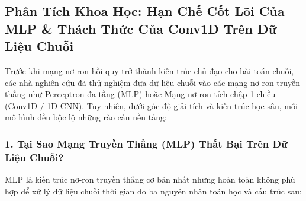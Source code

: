 \documentclass[12pt,a4paper]{report}
\begin{document}
\subsection{Phân Tích Khoa Học: Hạn Chế Cốt Lõi Của MLP \& Thách Thức Của Conv1D Trên Dữ Liệu Chuỗi}
Trước khi mạng nơ-ron hồi quy trở thành kiến trúc chủ đạo cho bài toán chuỗi, các nhà nghiên cứu đã thử nghiệm đưa dữ liệu chuỗi vào các mạng nơ-ron truyền thẳng như Perceptron đa tầng (MLP) hoặc Mạng nơ-ron tích chập 1 chiều (Conv1D / 1D-CNN). Tuy nhiên, dưới góc độ giải tích và kiến trúc học sâu, mỗi mô hình đều bộc lộ những rào cản nền tảng:

\subsubsection{1. Tại Sao Mạng Truyền Thẳng (MLP) Thất Bại Trên Dữ Liệu Chuỗi?}
MLP là kiến trúc nơ-ron truyền thẳng cơ bản nhất nhưng hoàn toàn không phù hợp để xử lý dữ liệu chuỗi thời gian do ba nguyên nhân toán học và cấu trúc sau:
\end{document}
